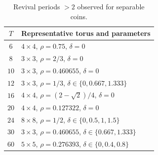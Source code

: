 \begin{table}[h]
\centering
\caption{Revival periods $>2$ observed for separable coins.}
\label{tab:violations}
\begin{tabular}{cl}
\toprule
$T$ & Representative torus and parameters \\
\midrule
$6$  & $4\times4$, $\rho=0.75$, $\delta=0$ \\
$8$  & $3\times3$, $\rho=2/3$, $\delta=0$ \\
$10$ & $3\times3$, $\rho=0.460655$, $\delta=0$ \\
$12$ & $3\times3$, $\rho=1/3$, $\delta\in\{0,0.667,1.333\}$ \\
$16$ & $4\times4$, $\rho=(2-\sqrt2)/4$, $\delta=0$ \\
$20$ & $4\times4$, $\rho=0.127322$, $\delta=0$ \\
$24$ & $8\times8$, $\rho=1/2$, $\delta\in\{0,0.5,1,1.5\}$ \\
$30$ & $3\times3$, $\rho=0.460655$, $\delta\in\{0.667,1.333\}$ \\
$60$ & $5\times5$, $\rho=0.276393$, $\delta\in\{0,0.4,0.8\}$ \\
\bottomrule
\end{tabular}
\end{table}
